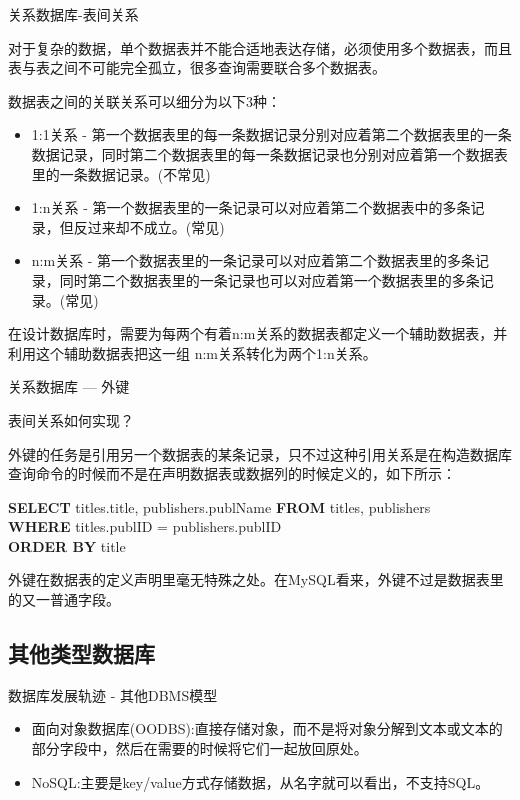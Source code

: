 \documentclass[CJK]{beamer}
\begin{document}
\begin{CJK*}{UTF8}{gbsn}
\begin{frame}{关系数据库-表间关系}
\begin{block}{}
{\small 对于复杂的数据，单个数据表并不能合适地表达存储，必须使用多个数据表，而且表与表之间不可能完全孤立，很多查询需要联合多个数据表。}
\end{block}
{\tiny
数据表之间的关联关系可以细分为以下3种：
\begin{itemize}
	\item 1:1关系 - 第一个数据表里的每一条数据记录分别对应着第二个数据表里的一条数据记录，同时第二个数据表里的每一条数据记录也分别对应着第一个数据表里的一条数据记录。({\color{red}不常见})
	\item 1:n关系 - 第一个数据表里的一条记录可以对应着第二个数据表中的多条记录，但反过来却不成立。({\color{red}常见})
	\item n:m关系 - 第一个数据表里的一条记录可以对应着第二个数据表里的多条记录，同时第二个数据表里的一条记录也可以对应着第一个数据表里的多条记录。({\color{red}常见})
\end{itemize}
}
\begin{block}{}
{\small 在设计数据库时，需要为每两个有着n:m关系的数据表都定义一个辅助数据表，并利用这个辅助数据表把这一组 n:m关系转化为两个1:n关系。}
\end{block}
\end{frame}
\begin{frame}{关系数据库 --- 外键}
	\begin{block}{}
	{\color{red}表间关系如何实现？}
	\end{block}
外键的任务是引用另一个数据表的某条记录，只不过这种引用关系是在构造数据库查询命令的时候而不是在声明数据表或数据列的时候定义的，如下所示：
\begin{block}{}
{\bf SELECT} titles.title, publishers.publName {\bf FROM} titles, publishers\\
{\bf WHERE} titles.publID = publishers.publID\\
{\bf ORDER BY} title
\end{block}
外键在数据表的定义声明里毫无特殊之处。在MySQL看来，外键不过是数据表里的又一普通字段。
\end{frame}

\subsection{其他类型数据库}
\begin{frame}{数据库发展轨迹 - 其他DBMS模型}
	\begin{itemize}
		\item 面向对象数据库(OODBS):直接存储对象，而不是将对象分解到文本或文本的部分字段中，然后在需要的时候将它们一起放回原处。
		\item NoSQL:主要是key/value方式存储数据，从名字就可以看出，不支持SQL。
	\end{itemize}
\end{frame}

\end{CJK*}
\end{document}

